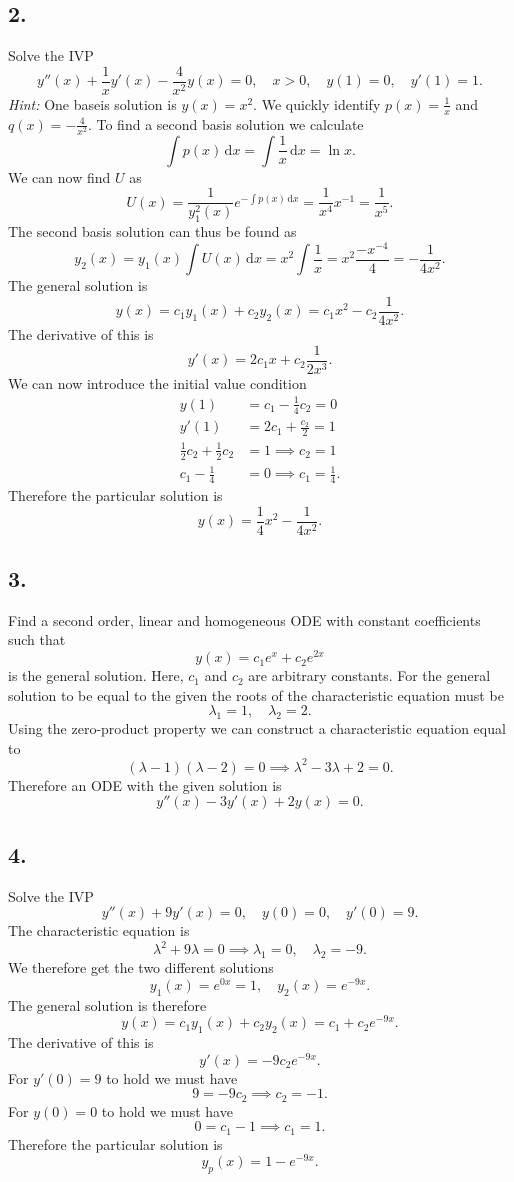 \subsection*{2.} Solve the IVP
\[ 
y''(x) + \frac{1}{x}y'(x) - \frac{4}{x^2}y(x) = 0, \quad x > 0, \quad y(1) = 0, \quad y'(1) = 1
.\]
\textit{Hint:} One baseis solution is $y(x) = x^2$.
\bigbreak
We quickly identify $p(x) = \frac{1}{x}$ and $q(x) = - \frac{4}{x^2}$. To find a second basis solution we calculate
\[ 
\int p(x) \, \mathrm{d}x = \int \frac{1}{x} \, \mathrm{d}x = \ln x
.\]
We can now find $U$ as
\[ 
U(x) = \frac{1}{y_1^2(x)} e^{- \int p(x) \, \mathrm{d}x} = \frac{1}{x^{4}} x^{-1} = \frac{1}{x^{5}}
.\]
The second basis solution can thus be found as
\[ 
y_2(x) = y_1(x) \int U(x) \, \mathrm{d}x = x^2 \int \frac{1}{x} = x^2 \frac{-x^{-4}}{4} = - \frac{1}{4x^2}
.\]
The general solution is
\[ 
y(x) = c_1 y_1(x) + c_2 y_2(x) = c_1 x^2 - c_2 \frac{1}{4x^2}
.\]
The derivative of this is
\[ 
y'(x) = 2c_1 x + c_2 \frac{1}{2x^3}
.\]
We can now introduce the initial value condition
\begin{align*}
  y(1) &= c_1 - \frac{1}{4}c_2 = 0 \\
  y'(1) &= 2c_1 + \frac{c_2}{2} = 1 \\
  \frac{1}{2} c_2 + \frac{1}{2} c_2 &= 1 \implies c_2 = 1 \\
  c_1 - \frac{1}{4} &= 0 \implies c_1 = \frac{1}{4}
.\end{align*}
Therefore the particular solution is
\[ 
y(x) = \frac{1}{4}x^2 - \frac{1}{4x^2}
.\]


\subsection*{3.} Find a second order, linear and homogeneous ODE with constant coefficients such that
\[ 
y(x) = c_1e^{x} + c_2 e^{2x}
\]
is the general solution. Here, $c_1$ and $c_2$ are arbitrary constants.
\bigbreak
For the general solution to be equal to the given the roots of the characteristic equation must be
\[ 
\lambda_1 = 1, \quad \lambda_2 = 2
.\]
Using the zero-product property we can construct a characteristic equation equal to
\[ 
  (\lambda - 1) (\lambda - 2) = 0 \implies \lambda^2 - 3 \lambda + 2 = 0
.\]
Therefore an ODE with the given solution is
\[ 
y''(x) - 3y'(x) + 2y(x) = 0
.\]


\subsection*{4.} Solve the IVP
\[ 
y''(x) + 9y'(x) = 0, \quad y(0) = 0, \quad y'(0) = 9
.\]
\bigbreak
The characteristic equation is
\[ 
\lambda^2 + 9 \lambda = 0 \implies \lambda_1 = 0, \quad \lambda_2 = -9
.\]
We therefore get the two different solutions
\[ 
y_1(x) = e^{0x} = 1, \quad y_2(x) = e^{-9x}
.\]
The general solution is therefore
\[ 
y(x) = c_1 y_1(x) + c_2 y_2 (x) = c_1 + c_2e^{-9x}
.\]
The derivative of this is
\[ 
y'(x) = -9c_2 e^{-9x}
.\]
For $y'(0) = 9$ to hold we must have
\[ 
9 = -9 c_2 \implies c_2 = -1
.\]
For $y(0) = 0$ to hold we must have
\[ 
0 = c_1 -1 \implies c_1 = 1
.\]
Therefore the particular solution is 
\[ 
y_p(x) = 1 - e^{-9x}
.\]




